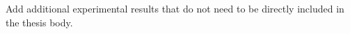 
\appendix

Add additional experimental results that do not need to be directly included in the thesis body. 


\endinput

